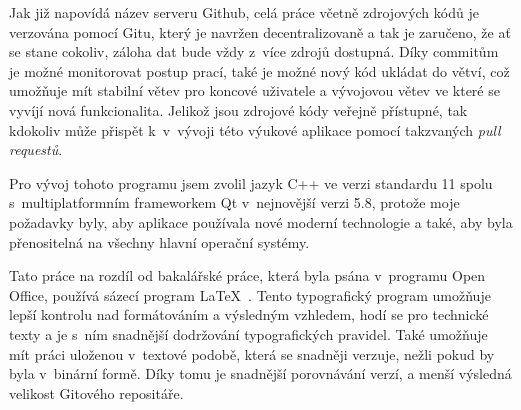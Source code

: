 Jak již napovídá název serveru Github, celá práce včetně zdrojových kódů je verzována pomocí Gitu, který je navržen decentralizovaně a tak je zaručeno, že ať se stane cokoliv, záloha dat bude vždy z~více zdrojů dostupná. Díky commitům je možné monitorovat postup prací, také je možné nový kód ukládat do větví, což umožňuje mít stabilní větev pro koncové uživatele a vývojovou větev ve které se vyvíjí nová funkcionalita. Jelikož jsou zdrojové kódy veřejně přístupné, tak kdokoliv může přispět k~v~vývoji této výukové aplikace pomocí takzvaných \textit{pull requestů}.

Pro vývoj tohoto programu jsem zvolil jazyk C++ ve verzi standardu 11 spolu s~multiplatformním frameworkem Qt v~nejnovější verzi 5.8, protože moje požadavky byly, aby aplikace používala nové moderní technologie a také, aby byla přenositelná na všechny hlavní operační systémy.

Tato práce na rozdíl od bakalářské práce, která byla psána v~programu Open Office, používá sázecí program \LaTeX\ \cite{latex}. Tento typografický program umožňuje lepší kontrolu nad formátováním a výsledným vzhledem, hodí se pro technické texty a je s~ním snadnější dodržování typografických pravidel. Také umožňuje mít práci uloženou v~textové podobě, která se snadněji verzuje, nežli pokud by byla v~binární formě. Díky tomu je snadnější porovnávání verzí, a menší výsledná velikost Gitového repositáře.




